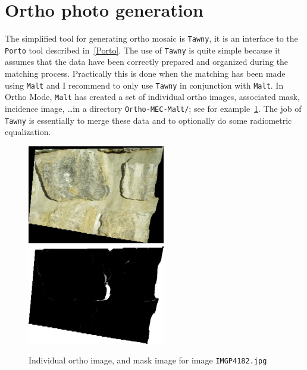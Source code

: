 
\section{Ortho photo generation}

The simplified tool for generating ortho mosaic is {\tt Tawny}, it is
an interface to the {\tt Porto} tool described in~\ref{Porto}. 
The use of {\tt Tawny} is quite simple because it assumes that
the data have been correctly prepared and organized during the matching
process. Practically this is done when the matching has been made using 
{\tt Malt} and I recommend to only use {\tt Tawny}  in conjunction with
{\tt Malt}. In Ortho Mode, {\tt Malt} has created a set of
individual ortho images, associated mask, incidence image, \dots in
a directory {\tt Ortho-MEC-Malt/}; see for example~\ref{FIG:Malt:Input}. 
 The job of {\tt Tawny} is essentially to merge these data and to optionally do some
radiometric equalization.



\begin{figure}
\begin{center}
\includegraphics[width=60mm]{FIGS/MurSaintMartin/Ort_IMGP4182.jpg}
\includegraphics[width=60mm]{FIGS/MurSaintMartin/PC_IMGP4182.jpg}
\end{center}
\caption{Individual ortho image, and mask image for image {\tt IMGP4182.jpg}}
\label{FIG:Malt:Input}
\end{figure}




